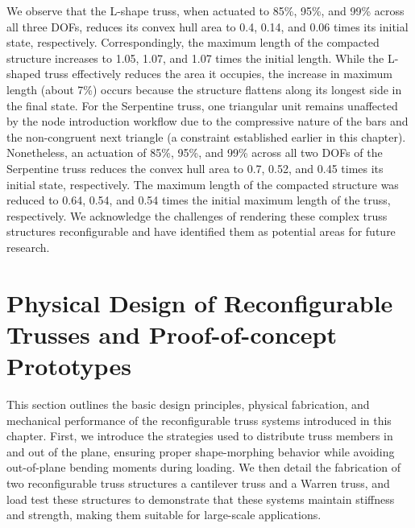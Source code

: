 We observe that the L-shape truss, when actuated to 85\%, 95\%, and 99\% across all three DOFs, reduces its convex hull area to 0.4, 0.14, and 0.06 times its initial state, respectively. Correspondingly, the maximum length of the compacted structure increases to 1.05, 1.07, and 1.07 times the initial length. While the L-shaped truss effectively reduces the area it occupies, the increase in maximum length (about 7\%) occurs because the structure flattens along its longest side in the final state. For the Serpentine truss, one triangular unit remains unaffected by the node introduction workflow due to the compressive nature of the bars and the non-congruent next triangle (a constraint established earlier in this chapter). Nonetheless, an actuation of 85\%, 95\%, and 99\% across all two DOFs of the Serpentine truss reduces the convex hull area to 0.7, 0.52, and 0.45 times its initial state, respectively. The maximum length of the compacted structure was reduced to 0.64, 0.54, and 0.54 times the initial maximum length of the truss, respectively. We acknowledge the challenges of rendering these complex truss structures reconfigurable and have identified them as potential areas for future research.

\section{Physical Design of Reconfigurable Trusses and Proof-of-concept Prototypes}\label{02-sec-fabrication}
This section outlines the basic design principles, physical fabrication, and mechanical performance of the reconfigurable truss systems introduced in this chapter. First, we introduce the strategies used to distribute truss members in and out of the plane, ensuring proper shape-morphing behavior while avoiding out-of-plane bending moments during loading. We then detail the fabrication of two reconfigurable truss structures \textemdash{} a cantilever truss and a Warren truss, and load test these structures to demonstrate that these systems maintain stiffness and strength, making them suitable for large-scale applications.

